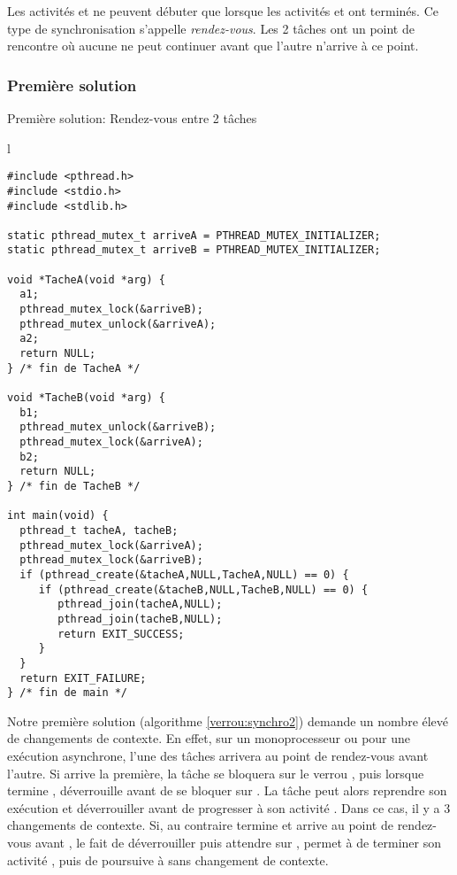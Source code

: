 Les activités  et  ne peuvent débuter que lorsque les activités  et  ont terminés. Ce type de synchronisation s'appelle {\em rendez-vous}. Les 2 tâches ont un point de rencontre où aucune ne peut continuer avant que l'autre n'arrive à ce point.

\subsubsection*{Première solution}
\begin{algorithm}[t]
\caption{Première solution: Rendez-vous entre 2 tâches}\label{verrou:synchro2}
\centering
\begin{tabular}{l}
\begin{lstlisting}
#include <pthread.h>
#include <stdio.h>
#include <stdlib.h>

static pthread_mutex_t arriveA = PTHREAD_MUTEX_INITIALIZER;
static pthread_mutex_t arriveB = PTHREAD_MUTEX_INITIALIZER;

void *TacheA(void *arg) {
  a1;
  pthread_mutex_lock(&arriveB);
  pthread_mutex_unlock(&arriveA);
  a2;
  return NULL;
} /* fin de TacheA */

void *TacheB(void *arg) {
  b1;
  pthread_mutex_unlock(&arriveB);
  pthread_mutex_lock(&arriveA);
  b2;
  return NULL;
} /* fin de TacheB */

int main(void) {
  pthread_t tacheA, tacheB;
  pthread_mutex_lock(&arriveA);
  pthread_mutex_lock(&arriveB);
  if (pthread_create(&tacheA,NULL,TacheA,NULL) == 0) {
     if (pthread_create(&tacheB,NULL,TacheB,NULL) == 0) {
        pthread_join(tacheA,NULL);
        pthread_join(tacheB,NULL);
        return EXIT_SUCCESS;
     }
  }
  return EXIT_FAILURE;
} /* fin de main */
\end{lstlisting}
\end{tabular}

\end{algorithm}

Notre première solution (algorithme \ref{verrou:synchro2}) demande un nombre élevé de changements de contexte. En effet, sur un monoprocesseur ou pour une exécution asynchrone, l'une des tâches arrivera au point de rendez-vous avant l'autre. Si  arrive la première, la tâche se bloquera sur le verrou , puis lorsque  termine ,  déverrouille  avant de se bloquer sur . La tâche  peut alors reprendre son exécution et déverrouiller  avant de progresser à son activité . Dans ce cas, il y a 3 changements de contexte. Si, au contraire  termine  et arrive au point de rendez-vous avant , le fait de déverrouiller  puis attendre sur , permet à  de terminer son activité , puis de poursuive à  sans changement de contexte.

